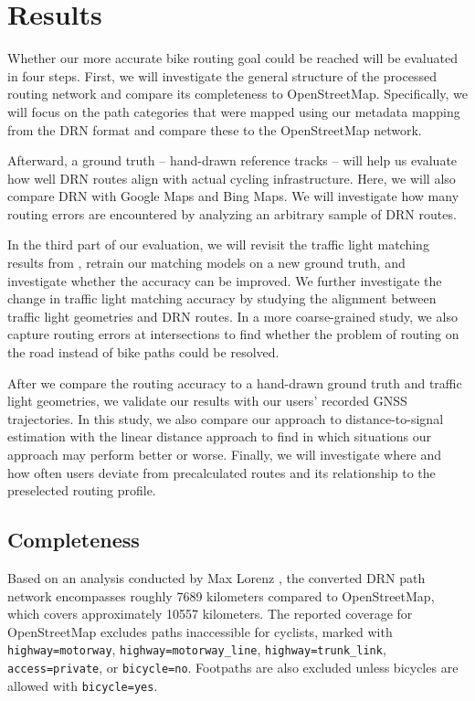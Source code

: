 \section{Results}

Whether our more accurate bike routing goal could be reached will be evaluated in four steps. First, we will investigate the general structure of the processed routing network and compare its completeness to OpenStreetMap. Specifically, we will focus on the path categories that were mapped using our metadata mapping from the DRN format and compare these to the OpenStreetMap network. 

Afterward, a ground truth -- hand-drawn reference tracks -- will help us evaluate how well DRN routes align with actual cycling infrastructure. Here, we will also compare DRN with Google Maps and Bing Maps. We will investigate how many routing errors are encountered by analyzing an arbitrary sample of DRN routes.

In the third part of our evaluation, we will revisit the traffic light matching results from , retrain our matching models on a new ground truth, and investigate whether the accuracy can be improved. We further investigate the change in traffic light matching accuracy by studying the alignment between traffic light geometries and DRN routes. In a more coarse-grained study, we also capture routing errors at intersections to find whether the problem of routing on the road instead of bike paths could be resolved. 

After we compare the routing accuracy to a hand-drawn ground truth and traffic light geometries, we validate our results with our users' recorded GNSS trajectories. In this study, we also compare our approach to distance-to-signal estimation with the linear distance approach to find in which situations our approach may perform better or worse. Finally, we will investigate where and how often users deviate from precalculated routes and its relationship to the preselected routing profile.

\subsection{Completeness}\label{sec:lorenz2}

Based on an analysis conducted by Max Lorenz \cite{lorenz_2022}, the converted DRN path network encompasses roughly 7689 kilometers compared to OpenStreetMap, which covers approximately 10557 kilometers. The reported coverage for OpenStreetMap excludes paths inaccessible for cyclists, marked with \texttt{highway=motorway}, \texttt{highway=motorway\_line}, \texttt{highway=trunk\_link}, \texttt{access=private}, or \texttt{bi\allowbreak cycle=no}. Footpaths are also excluded unless bicycles are allowed with \texttt{bicycle=yes}. 

